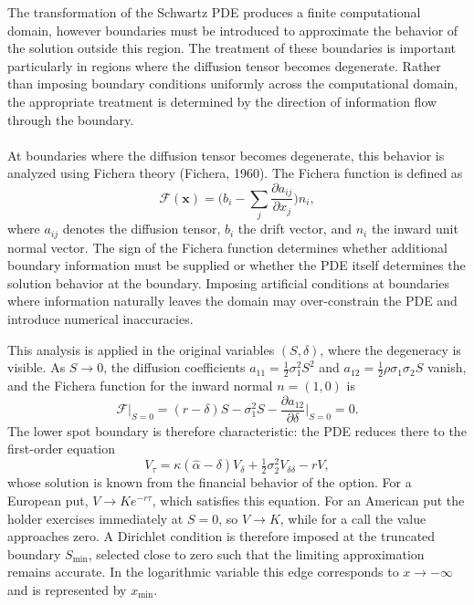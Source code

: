 \documentclass[12pt,a4paper]{article}
\begin{document}
The transformation of the Schwartz PDE produces a finite computational domain, however boundaries must be introduced to approximate the behavior of the solution outside this region. The treatment of these boundaries is important particularly in regions where the diffusion tensor becomes degenerate. Rather than imposing boundary conditions uniformly across the computational domain, the appropriate treatment is determined by the direction of information flow through the boundary.\\\\
At boundaries where the diffusion tensor becomes degenerate, this behavior is analyzed using Fichera theory (Fichera, 1960). The Fichera function is defined as
\begin{equation}
\mathcal{F}(\mathbf{x})=\Big(b_i-\sum_j\frac{\partial a_{ij}}{\partial x_j}\Big)n_i,
\end{equation}
where $a_{ij}$ denotes the diffusion tensor, $b_i$ the drift vector, and $n_i$ the inward unit normal vector. The sign of the Fichera function determines whether additional boundary information must be supplied or whether the PDE itself determines the solution behavior at the boundary. Imposing artificial conditions at boundaries where information naturally leaves the domain may over-constrain the PDE and introduce numerical inaccuracies.

This analysis is applied in the original variables $(S,\delta)$, where the degeneracy is visible. As $S\to0$, the diffusion coefficients $a_{11}=\frac12\sigma_1^2S^2$ and $a_{12}=\frac12\rho\sigma_1\sigma_2S$ vanish, and the Fichera function for the inward normal $n=(1,0)$ is
\begin{equation}
\mathcal{F}\big|_{S=0}=(r-\delta)S-\sigma_1^2S-\frac{\partial a_{12}}{\partial\delta}\Big|_{S=0}=0 .
\end{equation}
The lower spot boundary is therefore characteristic: the PDE reduces there to the first-order equation
\begin{equation}
V_\tau=\kappa(\hat\alpha-\delta)V_\delta+\tfrac12\sigma_2^2V_{\delta\delta}-rV,
\end{equation}
whose solution is known from the financial behavior of the option. For a European put, $V\to Ke^{-r\tau}$, which satisfies this equation. For an American put the holder exercises immediately at $S=0$, so $V\to K$, while for a call the value approaches zero. A Dirichlet condition is therefore imposed at the truncated boundary $S_{\min}$, selected close to zero such that the limiting approximation remains accurate. In the logarithmic variable this edge corresponds to $x\to-\infty$ and is represented by $x_{\min}$.
\end{document}
